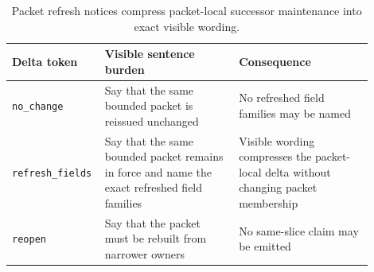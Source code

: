 \documentclass[11pt]{article}
\begin{document}
\begin{table}[t]
\centering
\small
\begin{tabularx}{\linewidth}{@{}p{0.18\linewidth} p{0.36\linewidth} p{0.36\linewidth}@{}}
\toprule
Delta token & Visible sentence burden & Consequence \\
\midrule
\texttt{no\_change} & Say that the same bounded packet is reissued unchanged & No refreshed field families may be named \\
\texttt{refresh\_fields} & Say that the same bounded packet remains in force and name the exact refreshed field families & Visible wording compresses the packet-local delta without changing packet membership \\
\texttt{reopen} & Say that the packet must be rebuilt from narrower owners & No same-slice claim may be emitted \\
\bottomrule
\end{tabularx}
\caption{Packet refresh notices compress packet-local successor maintenance into exact visible wording.}
\label{tab:publicrequestresponsepacketrefreshnotices}
\end{table}
\end{document}

